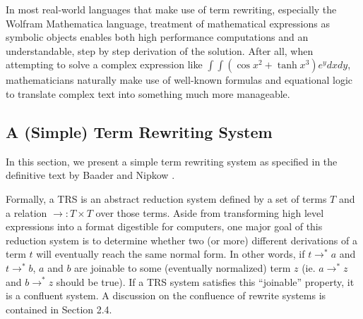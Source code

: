 \documentclass{article}
\begin{document}
In most real-world languages that make use of term rewriting, especially the Wolfram Mathematica language,
treatment of mathematical expressions as symbolic objects enables both high performance computations
and an understandable, step by step derivation of the solution. After all, when attempting to solve
a complex expression like $\int \int (\cos{x}^2 + \tanh{x}^3)e^y dx dy$, mathematicians naturally make use
of well-known formulas and equational logic to translate complex text into something much more manageable.












\subsection{A (Simple) Term Rewriting System}

In this section, we present a simple term rewriting system as specified in the definitive text by Baader and Nipkow \cite{baader1998term}.

Formally, a TRS is an abstract reduction system defined by a set of terms $T$ and a relation $\rightarrow: T \times T$ over those terms.
Aside from transforming high level expressions into a format digestible for computers,
one major goal of this reduction system is to determine whether two (or more) different derivations of a term $t$ will eventually reach the same normal form.
In other words, if $t \rightarrow^* a$ and $t \rightarrow^* b$,
$a$ and $b$ are joinable to some (eventually normalized) term $z$
(ie. $a \rightarrow^* z$ and $b \rightarrow^* z$ should be true).
If a TRS system satisfies this ``joinable'' property, it is a confluent system.
A discussion on the confluence of rewrite systems is contained in Section 2.4.
\end{document}
